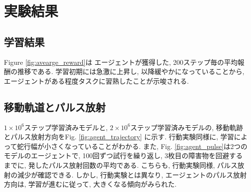 \documentclass[../main]{subfiles}
\begin{document}
\section{実験結果}
\subsection{学習結果}
Figure \ref{fig:avearge_reward}は
エージェントが獲得した, 
200ステップ毎の平均報酬の推移である.
学習初期には急激に上昇し, 以降緩やかになっていることから, 
エージェントがある程度タスクに習熟したことが示唆される.

\subsection{移動軌道とパルス放射}
$1\times 10^6$ステップ学習済みモデルと, 
$2\times 10^6$ステップ学習済みモデルの,
移動軌跡とパルス放射方向をFig. \ref{fig:agent_trajectory}
に示す.
行動実験同様に, 学習によって蛇行幅が小さくなっていることがわかる.
また, Fig. \ref{fig:agent_pulse}は2つのモデルのエージェントで, 
100回ずつ試行を繰り返し, 3枚目の障害物を回避するまでに, 
発したパルス放射回数の平均である.
こちらも, 行動実験同様, パルス放射の減少が確認できる.
しかし, 行動実験とは異なり, エージェントのパルス放射方向は, 
学習が進むに従って, 大きくなる傾向がみられた.
\end{document}
